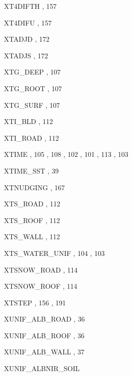 \begin{theindex}
  \item XT4DIFTH
    \subitem {},  157
  \item XT4DIFU
    \subitem {},  157
  \item XTADJD
    \subitem {},  172
  \item XTADJS
    \subitem {},  172
  \item XTG\_DEEP
    \subitem {},  107
  \item XTG\_ROOT
    \subitem {},  107
  \item XTG\_SURF
    \subitem {},  107
  \item XTI\_BLD
    \subitem {},  112
  \item XTI\_ROAD
    \subitem {},  112
  \item XTIME
    \subitem {},  105
    \subitem {},  108
    \subitem {},  102
    \subitem {},  101
    \subitem {},  113
    \subitem {},  103
  \item XTIME\_SST
    \subitem {},  39
  \item XTNUDGING
    \subitem {},  167
  \item XTS\_ROAD
    \subitem {},  112
  \item XTS\_ROOF
    \subitem {},  112
  \item XTS\_WALL
    \subitem {},  112
  \item XTS\_WATER\_UNIF
    \subitem {},  104
    \subitem {},  103
  \item XTSNOW\_ROAD
    \subitem {},  114
  \item XTSNOW\_ROOF
    \subitem {},  114
  \item XTSTEP
    \subitem {},  156
    \subitem {},  191
  \item XUNIF\_ALB\_ROAD
    \subitem {},  36
  \item XUNIF\_ALB\_ROOF
    \subitem {},  36
  \item XUNIF\_ALB\_WALL
    \subitem {},  37
  \item XUNIF\_ALBNIR\_SOIL

\end{theindex}
